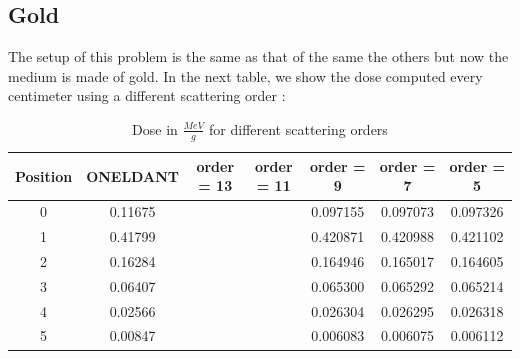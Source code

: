 \subsection{Gold}
The setup of this problem is the same as that of the same the others but now 
the medium is made of gold. In the next table, 
we show the dose computed every centimeter using a different scattering order :
\begin{table}[H]
\begin{center}
\caption{Dose in $\frac{MeV}{g}$ for different scattering orders}
\begin{tabular}{|c|c|c|c|c|c|c|}
\hline
Position & ONELDANT & order = 13 & order = 11 & order = 9 & order = 7 & order = 5 \\
\hline
0 & 0.11675 &  &  & 0.097155 & 0.097073 & 0.097326 \\
1 & 0.41799 &  &  & 0.420871 & 0.420988 & 0.421102 \\
2 & 0.16284 &  &  & 0.164946 & 0.165017 & 0.164605 \\
3 & 0.06407 &  &  & 0.065300 & 0.065292 & 0.065214 \\
4 & 0.02566 &  &  & 0.026304 & 0.026295 & 0.026318 \\
5 & 0.00847 &  &  & 0.006083 & 0.006075 & 0.006112 \\
\hline
\end{tabular}
\end{center}
\end{table}     
